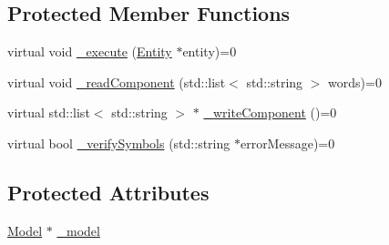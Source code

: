 \subsection*{Protected Member Functions}
\begin{DoxyCompactItemize}
\item 
virtual void \hyperlink{class_model_component_ae3fcf8bbdd8368c882438424aa73f714}{\-\_\-execute} (\hyperlink{class_entity}{Entity} $\ast$entity)=0
\item 
virtual void \hyperlink{class_model_component_aa16546b209d8fda2c8fa951e88652973}{\-\_\-read\-Component} (std\-::list$<$ std\-::string $>$ words)=0
\item 
virtual std\-::list$<$ std\-::string $>$ $\ast$ \hyperlink{class_model_component_a5847971e860713d9df3e41c603c772c0}{\-\_\-write\-Component} ()=0
\item 
virtual bool \hyperlink{class_model_component_a183696468482133b2a09b761b7770521}{\-\_\-verify\-Symbols} (std\-::string $\ast$error\-Message)=0
\end{DoxyCompactItemize}
\subsection*{Protected Attributes}
\begin{DoxyCompactItemize}
\item 
\hyperlink{class_model}{Model} $\ast$ \hyperlink{class_model_component_a9d9e835755618a794c9759882641bc3c}{\-\_\-model}
\end{DoxyCompactItemize}


